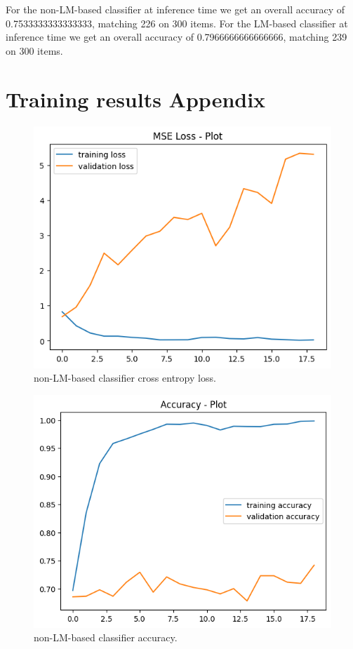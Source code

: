 \documentclass[11pt]{article}
\begin{document}
	For the non-LM-based classifier at inference time we get an overall accuracy of 0.7533333333333333, matching 226 on 300 items. For the LM-based classifier at inference time we get an overall accuracy of 0.7966666666666666, matching 239 on 300 items. 

	\appendix
	
	\section{Training results Appendix}
	\label{sec:appendix}
	
	\begin{figure}
		\includegraphics[width=\linewidth]{loss-no-transformer.png}
		\caption{non-LM-based classifier cross entropy loss.}
		\label{fig:1}
	\end{figure}
	
	\begin{figure}
		\includegraphics[width=\linewidth]{accuracy-no-transformer.png}
		\caption{non-LM-based classifier accuracy.}
		\label{fig:2}
	\end{figure}
	
\end{document}
